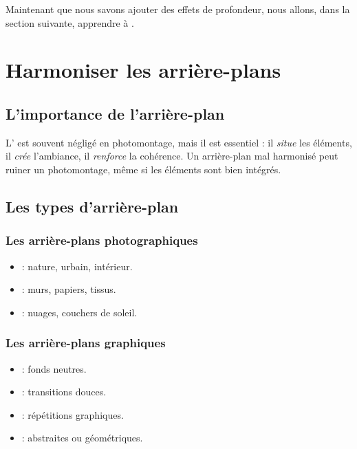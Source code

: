 Maintenant que nous savons ajouter des effets de profondeur, nous allons, dans la section suivante, apprendre à .

\section{Harmoniser les arrière-plans}

\subsection{L'importance de l'arrière-plan}

L' est souvent négligé en photomontage, mais il est essentiel : il \emph{situe} les éléments, il \emph{crée} l'ambiance, il \emph{renforce} la cohérence. Un arrière-plan mal harmonisé peut ruiner un photomontage, même si les éléments sont bien intégrés.

\subsection{Les types d'arrière-plan}

\subsubsection{Les arrière-plans photographiques}

\begin{itemize}
    \item {} : nature, urbain, intérieur.
    \item {} : murs, papiers, tissus.
    \item {} : nuages, couchers de soleil.
\end{itemize}

\subsubsection{Les arrière-plans graphiques}

\begin{itemize}
    \item {} : fonds neutres.
    \item {} : transitions douces.
    \item {} : répétitions graphiques.
    \item {} : abstraites ou géométriques.
\end{itemize}

